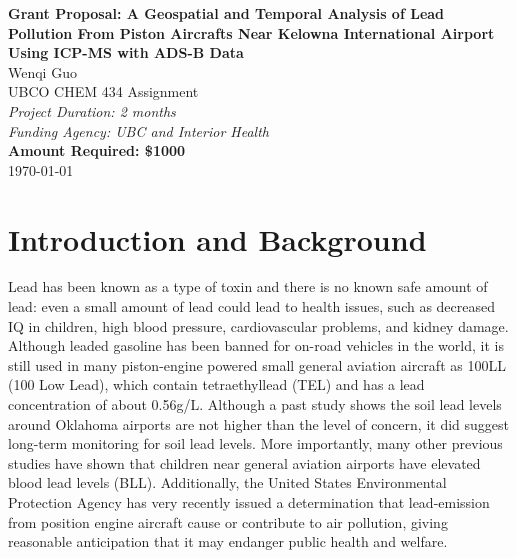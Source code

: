 \documentclass[12pt]{article}
\begin{document}
\begin{center}
    \Large{\textbf{Grant Proposal: A Geospatial and Temporal Analysis of Lead Pollution From Piston Aircrafts Near Kelowna International Airport Using ICP-MS with ADS-B Data}}\\
    \vspace{1cm}
    \large{Wenqi Guo}\\
    \vspace{0.5cm}
    \large{UBCO CHEM 434 Assignment}\\
    \vspace{0.5cm}
    \textit{Project Duration: 2 months}\\
    \vspace{0.5cm}
    \textit{Funding Agency: UBC and Interior Health}\\
    \vspace{0.5cm}
    \textbf{Amount Required: \$1000}\\
    \vspace{1cm}
    \vspace{1cm}
    \today
\end{center}
\newpage

\section{Introduction and Background}
Lead has been known as a type of toxin and there is no known safe amount of lead: even a small amount of lead could lead to health issues, such as decreased IQ in children, high blood pressure, cardiovascular problems, and kidney damage. \cite{world_health_organization_lead_2023} Although leaded gasoline has been banned for on-road vehicles in the world, it is still used in many piston-engine powered small general aviation aircraft as 100LL (100 Low Lead), which contain tetraethyllead (TEL) and has a lead concentration of about 0.56g/L. 
\cite{noauthor_safety_2021} Although a past study shows the soil lead levels around Oklahoma airports are not higher than the level of concern, it did suggest long-term monitoring for soil lead levels. \cite{mccumber_geospatial_2017} More importantly, many other previous studies have shown that children near general aviation airports have elevated blood lead levels (BLL). \cite{miranda_geospatial_2011} \cite{zahran_leaded_2023} \cite{mills_lead_2022} \cite{zahran_effect_2017} Additionally, the United States Environmental Protection Agency has very recently issued a determination that lead-emission from position engine aircraft cause or contribute to air pollution, giving reasonable anticipation that it may endanger public health and welfare. \cite{us_epa_epa_2023}
\end{document}
